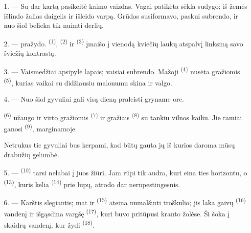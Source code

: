 \VUsaut{5.0mm}
\VUsaut{3.0mm}
\VUsaut{3.0mm}
\VUsaut{4.0mm}
\VUsaut{3.0mm}

1. --- Su  dar kartą pasikeitė kaimo vaizdas. Vagai patikėta sėkla
sudygo; iš žemės išlindo žalias daigelis ir išleido varpą. Grūdas susiformavo, paskui
subrendo, ir nuo šiol belieka tik nuimti derlių.

2. ---  pražydo.  \textsuperscript{(1)},
 \textsuperscript{(2)} ir  \textsuperscript{(3)}
įmaišo į vienodą kviečių laukų atspalvį linksmą savo šviežių 
kontrastą.

3. --- Vaismedžiai apsipylė lapais; vaisiai subrendo. Mažoji 
\textsuperscript{(4)} nusėta gražiomis  \textsuperscript{(5)},
kurias vaikai su didžiausiu malonumu skina ir valgo.

4. --- Nuo šiol gyvuliai gali visą dieną praleisti gryname ore.

 \textsuperscript{(6)} užaugo ir virto gražiomis 
\textsuperscript{(7)} ir gražiais  \textsuperscript{(8)} su tankiu
vilnos kailiu. Jie ramiai ganosi  
\textsuperscript{(9)}, marginamoje 

Netrukus tie gyvuliai bus kerpami, kad būtų gauta jų  iš kurios daroma
mūsų drabužių gelumbė.

\VUsaut{5.0mm}
\VUsaut{3.4mm}

5. ---  \textsuperscript{(10)} tarsi nelabai į juos žiūri. Jam rūpi
tik audra, kuri eina ties horizontu, o  \textsuperscript{(13)},
kuris kelia  \textsuperscript{(14)} prie lūpų, atrodo dar
nerūpestingesnis.

6. --- Karštis slegiantis; mat ir  \textsuperscript{(15)} ateina
numalšinti troškulio; jis laka gaivų  \textsuperscript{(16)} vandenį ir
išgąsdina vargšę  \textsuperscript{(17)}, kuri buvo pritūpusi kranto
žolėse. Ši šoka į skaidrų vandenį, kur žydi 
\textsuperscript{(18)}.

